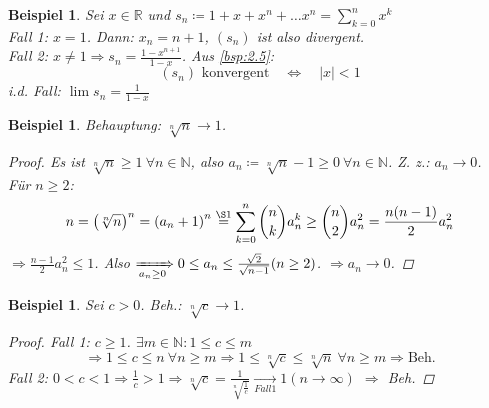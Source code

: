 \documentclass[titlepage,ngerman,a4paper,headsepline,DIV15,halfparskip*,14pt]{scrartcl}
\newcommand{\R}{\mathbb{R}}
\newcommand{\N}{\mathbb{N}}
\theoremstyle{dotless}
\newtheorem{beispiel}[satz]{Beispiel}
\begin{document}
\begin{beispiel} \label{bsp:2.6}
	Sei $x \in \R$ und $s_{n} \coloneqq 1 + x + x^{n} + \dotsc x^{n} = \sum_{k = 0}^{n} x^{k}$ \\
	Fall 1: $x = 1$. Dann: $x_{n} = n + 1$, $(s_{n})$ ist also divergent. \\
	Fall 2: $x \neq 1 \Rightarrow s_{n} = \frac{1 - x^{n+1}}{1 - x}$. Aus \ref{bsp:2.5}:
	$$
		(s_{n}) \text{ konvergent} \quad \iff \quad |x| < 1
	$$
	i.d. Fall: $\lim s_{n} = \frac{1}{1 - x}$
\end{beispiel}


\begin{beispiel} \label{bsp:2.7}
	Behauptung: $\sqrt[n]{n} \rightarrow 1$.
	
	\begin{proof}
		Es ist $\sqrt[n]{n} \geq 1 ~\forall n \in \N$, also $a_{n} \coloneqq \sqrt[n]{n} - 1 \geq 0 ~\forall n \in \N$. Z. z.: $a_{n} \rightarrow 0$. \\
		Für $n \geq 2$:
		$$
			n = \left( \sqrt[n]{n} \right)^{n} = \left( a_{n} + 1 \right)^{n} \overset{\S 1}{=} \sum_{k=0}^{n} \binom{n}{k} a_{n}^{k} \geq \binom{n}{2} a_{n}^{2} = \frac{n(n-1)}{2} a_{n}^{2}
		$$
		$\Rightarrow \frac{n-1}{2}a_{n}^{2} \leq 1$. Also $\xRightarrow[a_{n} \geq 0]{} 0 \leq a_{n} \leq \frac{\sqrt{2}}{\sqrt{n-1}} (n \geq 2)$. $\Rightarrow a_{n} \rightarrow 0$.
	\end{proof}
\end{beispiel}


\begin{beispiel} \label{bsp:2.8}
	Sei $c > 0$. Beh.: $\sqrt[n]{c} \rightarrow 1$.
	
	\begin{proof}
		Fall 1: $c \geq 1$. $\exists m \in \N: 1 \leq c \leq m$
		$$
		 \Rightarrow 1 \leq c \leq n ~\forall n \geq m \Rightarrow 1 \leq \sqrt[n]{c} \leq \sqrt[n]{n} ~\forall n\geq m \Rightarrow \text{Beh.}
		$$
		Fall 2: $0 < c <1 \Rightarrow \frac{1}{c} > 1 \Rightarrow \sqrt[n]{c} = \frac{1}{\sqrt[n]{\frac{1}{c}}} \xrightarrow[Fall 1]{} 1 (n \rightarrow \infty)$ $\Rightarrow$ Beh.
	\end{proof}
\end{beispiel}
\end{document}
